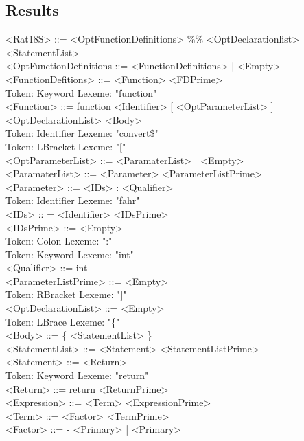 \documentclass[11pt]{article}
\begin{document}
\subsection*{Results}
\label{sec-3-1}
<Rat18S> ::= <OptFunctionDefinitions> \%\% <OptDeclarationlist>
<StatementList> \\
        <OptFunctionDefinitions ::= <FunctionDefinitions> | <Empty> \\
        <FunctionDefitions> ::= <Function> <FDPrime> \\
Token: Keyword   Lexeme: "function" \\
        <Function> ::= function <Identifier> [ <OptParameterList> ]
<OptDeclarationList> <Body> \\
Token: Identifier        Lexeme: "convert\$" \\
Token: LBracket          Lexeme: "[" \\
        <OptParameterList> ::= <ParamaterList> | <Empty> \\
        <ParamaterList> ::= <Parameter> <ParameterListPrime> \\
        <Parameter> ::= <IDs> : <Qualifier> \\
Token: Identifier        Lexeme: "fahr" \\
        <IDs> :: = <Identifier> <IDsPrime> \\
        <IDsPrime> ::= <Empty> \\
Token: Colon     Lexeme: ":" \\
Token: Keyword   Lexeme: "int" \\
        <Qualifier> ::= int \\
        <ParameterListPrime> ::= <Empty> \\
Token: RBracket          Lexeme: "]" \\
        <OptDeclarationList> ::= <Empty> \\
Token: LBrace    Lexeme: "\{" \\
        <Body> ::= \{ <StatementList> \} \\
        <StatementList> ::= <Statement> <StatementListPrime> \\
        <Statement> ::= <Return> \\
Token: Keyword   Lexeme: "return" \\
        <Return> ::= return <ReturnPrime> \\
        <Expression> ::= <Term> <ExpressionPrime> \\
        <Term> ::= <Factor> <TermPrime> \\
        <Factor> ::= - <Primary> | <Primary> \\
\end{document}
